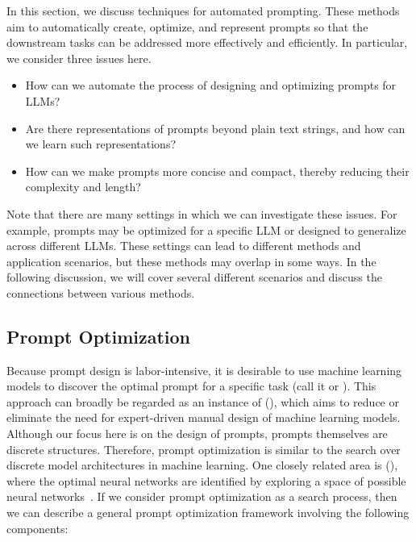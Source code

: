 In this section, we discuss techniques for automated prompting. These methods aim to automatically create, optimize, and represent prompts so that the downstream tasks can be addressed more effectively and efficiently. In particular, we consider three issues here.

\begin{itemize}
\item \vspace{0.5em} How can we automate the process of designing and optimizing prompts for LLMs?
\item \vspace{0.3em} Are there representations of prompts beyond plain text strings, and how can we learn such representations?
\item \vspace{0.3em} How can we make prompts more concise and compact, thereby reducing their complexity and length?
\end{itemize}
\vspace{0.5em}

Note that there are many settings in which we can investigate these issues. For example, prompts may be optimized for a specific LLM or designed to generalize across different LLMs. These settings can lead to different methods and application scenarios, but these methods may overlap in some ways. In the following discussion, we will cover several different scenarios and discuss the connections between various methods.

\subsection{Prompt Optimization}

\noindent Because prompt design is labor-intensive, it is desirable to use machine learning models to discover the optimal prompt for a specific task (call it  or ). This approach can broadly be regarded as an instance of  (), which aims to reduce or eliminate the need for expert-driven manual design of machine learning models. Although our focus here is on the design of prompts, prompts themselves are discrete structures. Therefore, prompt optimization is similar to the search over discrete model architectures in machine learning. One closely related area is  (), where the optimal neural networks are identified by exploring a space of possible neural networks~\cite{zoph-and-Le:2016neural,elsken-etal:2019nas}. If we consider prompt optimization as a search process, then we can describe a general prompt optimization framework involving the following components:

